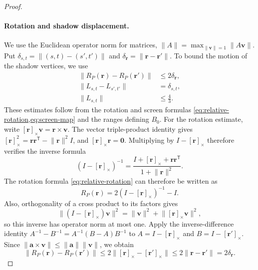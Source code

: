 \begin{proof}
  \paragraph{Rotation and shadow displacement.}
  We use the Euclidean operator norm for matrices,
  $\lVert A\rVert=\max_{\lVert\mathbf v\rVert=1}\lVert A\mathbf v\rVert$.
  Put $\delta_{s,t}=\lVert(s,t)-(s',t')\rVert$ and
  $\delta_{\mathbf r}=\lVert\mathbf r-\mathbf r'\rVert$. To bound the motion
  of the shadow vertices, we use
  \begin{equation}\label{eq:rotation-and-screen-displacement-bounds}
    \begin{aligned}
      \lVert R_P(\mathbf r)-R_P(\mathbf r')\rVert&\le2\delta_{\mathbf r},\\
      \lVert L_{s,t}-L_{s',t'}\rVert&=\delta_{s,t},\\
      \lVert L_{s,t}\rVert&\le\frac43.
    \end{aligned}
  \end{equation}
  These estimates follow from the rotation and screen formulas
  \cref{eq:relative-rotation,eq:screen-map} and the ranges defining $B_0$.
  For the rotation estimate, write
  ${[\mathbf r]}_\times\mathbf v=\mathbf r\times\mathbf v$. The vector
  triple-product identity gives
  ${[\mathbf r]}_\times^2=\mathbf r\mathbf r^{\mathsf T}-\lVert\mathbf r\rVert^2I$,
  and ${[\mathbf r]}_\times\mathbf r=\mathbf0$. Multiplying by $I-{[\mathbf r]}_\times$
  therefore verifies the inverse formula
  \[
    {(I-{[\mathbf r]}_\times)}^{-1}
      =\frac{I+{[\mathbf r]}_\times+\mathbf r\mathbf r^{\mathsf T}}
             {1+\lVert\mathbf r\rVert^2}.
  \]
  The rotation formula \cref{eq:relative-rotation} can therefore be written as
  \[
    R_P(\mathbf r)=2{(I-{[\mathbf r]}_\times)}^{-1}-I.
  \]
  Also, orthogonality of a cross product to its factors gives
  \[
    \lVert(I-{[\mathbf r]}_\times)\mathbf v\rVert^2
      =\lVert\mathbf v\rVert^2+\lVert {[\mathbf r]}_\times\mathbf v\rVert^2,
  \]
  so this inverse has operator norm at most one. Apply the inverse-difference
  identity $A^{-1}-B^{-1}=A^{-1}(B-A)B^{-1}$ to
  $A=I-{[\mathbf r]}_\times$ and $B=I-{[\mathbf r']}_\times$. Since
  $\lVert\mathbf a\times\mathbf v\rVert\le\lVert\mathbf a\rVert\lVert\mathbf v\rVert$,
  we obtain
  \[
    \lVert R_P(\mathbf r)-R_P(\mathbf r')\rVert
      \le2\lVert {[\mathbf r]}_\times-{[\mathbf r']}_\times\rVert
      \le2\lVert\mathbf r-\mathbf r'\rVert=2\delta_{\mathbf r}.
  \]


\end{proof}
